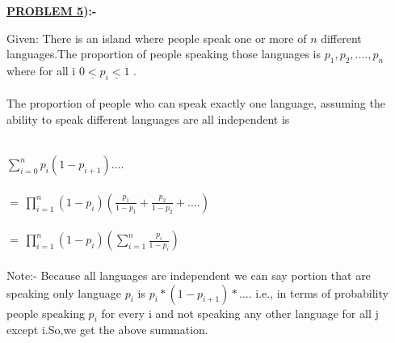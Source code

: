 \documentclass[a4paper]{article}
\begin{document}
\newpage
\begin{flushleft}
\Large{\textbf{\underline{PROBLEM 5}):-}}
\Large{
Given: There is an island where people speak one or more of $n$ different languages.The proportion of people speaking those languages is $p_1,p_2,....,p_n$ where for all i $0\underline{<}p_i\underline{<}1$ .\\ \ \\
The proportion of people who can speak exactly one language, assuming the
ability to speak different languages are all independent is\\ \ \\
\begin{center}
$\sum_{i=0}^n{p_i(1-p_{i+1})....}$\\ \ \\
$=\ {\prod_{i=1}^n ({1-p_i})}(\frac{p_1}{1-p_1}+\frac{p_2}{1-p_2}+....)$\\ \ \\
$=\ \prod_{i=1}^n ({1-p_i})(\sum_{i=1}^n {\frac{p_i}{1-p_i}})$\\ \ \\
Note:- Because all languages are independent we can say portion that are speaking only language $p_i$ is $p_i*(1-p_{i+1})*....$ i.e., in terms of probability people speaking $p_i$
 for every i and not speaking any other language for all j except i.So,we get the above summation.\\ \ \\ 
\end{center}
}
\end{flushleft}
\end{document}
